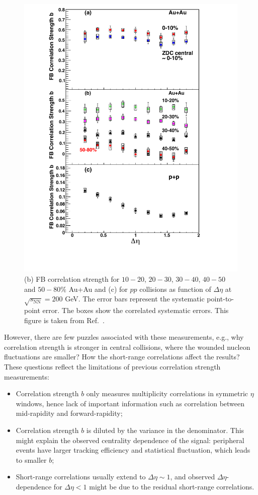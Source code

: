 \begin{figure}[H]
\centering
\includegraphics[width=.7\linewidth]{figs/chapter_fbcorr/star_fb.pdf}
\caption{(b) FB correlation strength for $10-20$, $20-30$, $30-40$, $40-50$ and $50-80\%$ Au+Au and (c) for $pp$ collisions as function of $\Delta\eta$ at $\sqrt{s_\text{NN}}=200$ GeV. The error bars represent the systematic point-to-point error. The boxes show the correlated systematic errors. This figure is taken from Ref.~\cite{Abelev:2009ag}.}
\label{fig:fbcorr_star_fb}
\end{figure}

However, there are few puzzles associated with these measurements, e.g., why correlation strength is stronger in central collisions, where the wounded nucleon fluctuations are smaller? How the short-range correlations affect the results? These questions reflect the limitations of previous correlation strength measurements:
\begin{itemize}
\item Correlation strength $b$ only measures multiplicity correlations in symmetric $\eta$ windows, hence lack of important information such as correlation between mid-rapidity and forward-rapidity;
\item Correlation strength $b$ is diluted by the variance in the denominator. This might explain the observed centrality dependence of the signal: peripheral events have larger tracking efficiency and statistical fluctuation, which leads to smaller $b$;
\item Short-range correlations usually extend to $\Delta\eta \sim 1$, and observed $\Delta\eta$-dependence for $\Delta\eta < 1$ might be due to the residual short-range correlations.
\end{itemize}


